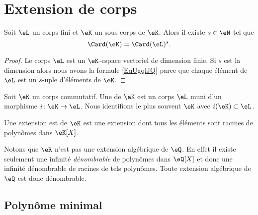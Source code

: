 \section{Extension de corps}
\label{SECooLQVJooTGeqiR}

\begin{lemma}       \label{LemobATFP}
    Soit \( \eL\) un corps fini et \( \eK\) un sous corps de \( \eK\). Alors il existe \( s\in \eN\) tel que
    \begin{equation}        \label{EqUgqlJQ}
        \Card(\eK)=\Card(\eL)^s.
    \end{equation}
\end{lemma}

\begin{proof}
    Le corps \( \eL\) est un \( \eK\)-espace vectoriel de dimension finie. Si \( s\) est la dimension alors nous avons la formule \eqref{EqUgqlJQ} parce que chaque élément de \( \eL\) est un \( s\)-uple d'éléments de \( \eK\).
\end{proof}

\begin{definition}      \label{DEFooFLJJooGJYDOe}
    Soit \( \eK\) un corps commutatif. Une  de \( \eK\) est un corps \( \eL\) muni d'un morphisme \( i\colon \eK\to \eL\). Nous identifions le plus souvent \( \eK\) avec \( i(\eK)\subset \eL\).

    Une extension est  de \( \eK\) est une extension dont tous les éléments sont racines de polynômes dans \( \eK[X]\).
\end{definition}
Notons que \( \eR\) n'est pas une extension algébrique de \( \eQ\). En effet il existe seulement une infinité \emph{dénombrable} de polynômes dans \( \eQ[X]\) et donc une infinité dénombrable de racines de tels polynômes. Toute extension algébrique de \( \eQ\) est donc dénombrable.

\subsection{Polynôme minimal}

